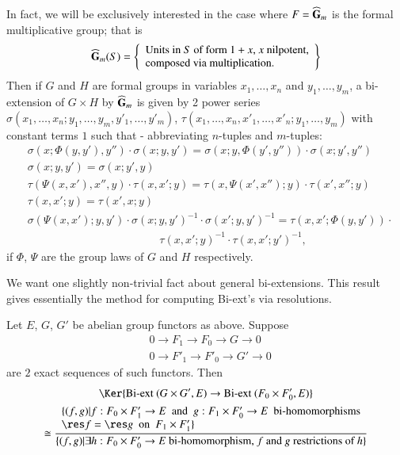 In fact, we will be exclusively interested in the case where $F=\widehat{\mathbf{G}}_{m}$ is the formal multiplicative group; that is
$$
\widehat{\mathbf{G}}_{m}(S)=
\left\{
\begin{array}{l}
\text{Units in $S$ of form $1+x$, $x$ nilpotent,}\\
\text{composed via multiplication.}
\end{array}
\right\}
$$
Then if $G$ and $H$ are formal groups in variables $x_{1},\ldots,x_{n}$ and $y_{1},\ldots,y_{m}$, a bi-extension of $G\times H$ by $\widehat{\mathbf{G}}_{m}$ is given by 2 power series $\sigma(x_{1},\ldots,x_{n};y_{1},\ldots,y_{m},y'_{1},\ldots,y'_{m})$, $\tau(x_{1},\ldots,x_{n},x'_{1},\ldots,x'_{n};y_{1},\ldots,y_{m})$ with constant terms $1$ such that - abbreviating $n$-tuples and $m$-tuples:
\begin{align*}
& \sigma(x;\Phi(y,y'),y'')\cdot \sigma(x;y,y')=\sigma(x;y,\Phi(y',y''))\cdot \sigma (x;y',y'')\\
& \sigma(x;y,y')=\sigma(x;y',y)\\
& \tau (\Psi(x,x'),x'',y)\cdot \tau(x,x';y)=\tau(x,\Psi(x',x'');y)\cdot \tau(x',x'';y)\\
& \tau (x,x';y)=\tau(x',x;y)\\
& \sigma(\Psi(x,x');y,y')\cdot \sigma(x;y,y')^{-1}\cdot \sigma (x';y,y')^{-1}=\tau(x,x';\Phi(y,y'))\cdot\\
&\hspace{5cm} \tau(x,x';y)^{-1}\cdot \tau(x,x';y')^{-1},
\end{align*}
if $\Phi$, $\Psi$ are the group laws of $G$ and $H$ respectively.

We want one slightly non-trivial fact about general bi-extensions. This result gives essentially the method for computing Bi-ext's via resolutions.

\begin{proposition}\label{art15-prop1}
Let $E$, $G$, $G'$ be abelian group functors as above. Suppose
\begin{align*}
& 0\to F_{1}\to F_{0}\to G\to 0\\
& 0\to F'_{1}\to F'_{0}\to G'\to 0
\end{align*}
are $2$ exact sequences of such functors. Then
\begin{gather*}
\Ker \{\text{\rm Bi-ext }(G\times G',E)\to \text{\rm Bi-ext } (F_{0}\times F'_{0},E)\}\\
\cong \frac{\begin{array}{l}\{(f,g)|f:F_{0}\times F'_{1}\to E\text{~ and~ } g:F_{1}\times F'_{0}\to E\text{~ bi-homomorphisms}\\ \res f=\res g\text{~ on~ } F_{1}\times F'_{1}\}\end{array}}{\{(f,g)|\exists h:F_{0}\times F'_{0}\to E\text{ bi-homomorphism,~} f \text{~and~} g \text{~restrictions of~} h\}}
\end{gather*}\pageoriginale
\end{proposition}

